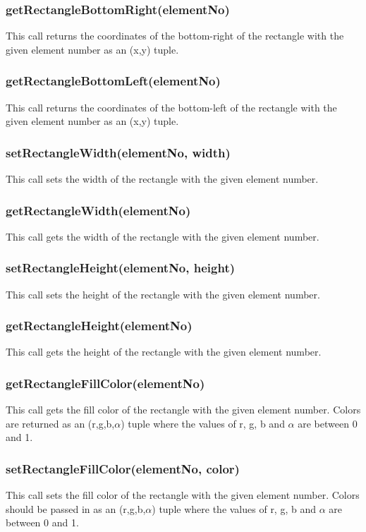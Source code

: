 \documentclass{acm_proc_article-sp}
\begin{document}
\subsubsection{getRectangleBottomRight(elementNo)}
This call returns the coordinates of the bottom-right of the rectangle with the given element number as an (x,y) tuple.
\subsubsection{getRectangleBottomLeft(elementNo)}
This call returns the coordinates of the bottom-left of the rectangle with the given element number as an (x,y) tuple.
\subsubsection{setRectangleWidth(elementNo, width)}
This call sets the width of the rectangle with the given element number.
\subsubsection{getRectangleWidth(elementNo)}
This call gets the width of the rectangle with the given element number.
\subsubsection{setRectangleHeight(elementNo, height)}
This call sets the height of the rectangle with the given element number.
\subsubsection{getRectangleHeight(elementNo)}
This call gets the height of the rectangle with the given element number.
\subsubsection{getRectangleFillColor(elementNo)}
This call gets the fill color of the rectangle with the given element number. Colors are returned as an (r,g,b,$\alpha$) tuple where the values of r, g, b and $\alpha$ are between 0 and 1.
\subsubsection{setRectangleFillColor(elementNo, color)}
This call sets the fill color of the rectangle with the given element number. Colors should be passed in as an (r,g,b,$\alpha$) tuple where the values of r, g, b and $\alpha$ are between 0 and 1.
\end{document}
